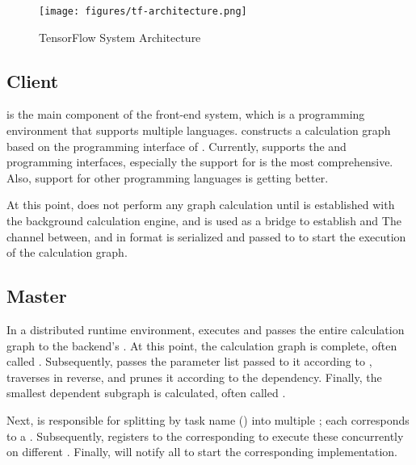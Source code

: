 \begin{content}
\begin{figure}[H]
\centering
\texttt{[image: figures/tf-architecture.png]}
\caption{TensorFlow System Architecture}
 \label{fig:tf-architecture}
\end{figure}

\subsection{Client}

 is the main component of the front-end system, which is a programming environment that supports multiple languages.  constructs a calculation graph based on the programming interface of . Currently,  supports the  and  programming interfaces, especially the  support for  is the most comprehensive. Also,  support for other programming languages ​​is getting better.

At this point,  does not perform any graph calculation until  is established with the background calculation engine, and  is used as a bridge to establish  and  The channel between, and  in  format is serialized and passed to  to start the execution of the calculation graph.

\subsection{Master}

In a distributed runtime environment,  executes  and passes the entire calculation graph to the backend's . At this point, the calculation graph is complete, often called \emph{}. Subsequently,  passes the  parameter list passed to it according to , traverses  in reverse, and prunes it according to the dependency. Finally, the smallest dependent subgraph is calculated, often called .

Next,  is responsible for splitting  by task name () into multiple ; each  corresponds to a . Subsequently,  registers  to the corresponding  to execute these  concurrently on different . Finally,  will notify all  to start the corresponding  implementation.


\end{content}
